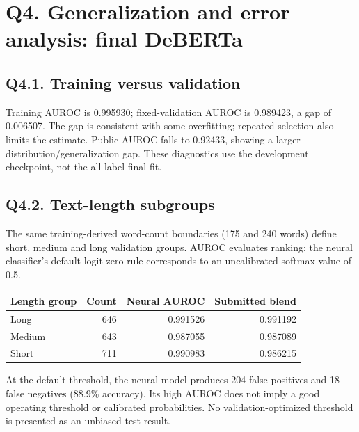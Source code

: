 \newpage\begingroup\small\setlength{\emergencystretch}{2em}
\section*{Q4. Generalization and error analysis: final DeBERTa}
\subsection*{Q4.1. Training versus validation}
Training AUROC is 0.995930; fixed-validation AUROC is 0.989423, a gap of 0.006507. The gap is consistent with some overfitting; repeated selection also limits the estimate. Public AUROC falls to 0.92433, showing a larger distribution/generalization gap. These diagnostics use the development checkpoint, not the all-label final fit.
\subsection*{Q4.2. Text-length subgroups}

The same training-derived word-count boundaries (175 and 240 words) define short, medium and long validation groups. AUROC evaluates ranking; the neural classifier's default logit-zero rule corresponds to an uncalibrated softmax value of 0.5.
\par\noindent
\begin{tabularx}{\linewidth}{@{}Yrrr@{}}\toprule
Length group & Count & Neural AUROC & Submitted blend\\\midrule
Long & 646 & 0.991526 & 0.991192 \\
Medium & 643 & 0.987055 & 0.987089 \\
Short & 711 & 0.990983 & 0.986215 \\
\bottomrule\end{tabularx}\par
At the default threshold, the neural model produces 204 false positives and 18 false negatives (88.9\% accuracy). Its high AUROC does not imply a good operating threshold or calibrated probabilities. No validation-optimized threshold is presented as an unbiased test result.

